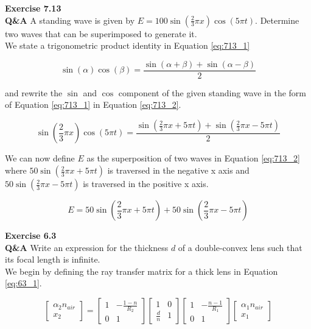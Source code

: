 \documentclass[main.tex]{subfiles}
\begin{document}
\textbf{Exercise 7.13}\\ %
\textbf{Q\&A} A standing wave is given by $E=100\sin(\frac{2}{3}\pi x) \cos( 5\pi t )$. Determine two waves that can be superimposed to generate it.\\

We state a trigonometric product identity in Equation \ref{eq:713_1}

\begin{equation}\label{eq:713_1}
\sin(\alpha)\cos(\beta) = \frac{\sin(\alpha + \beta) + \sin(\alpha - \beta)}{2}
\end{equation}

and rewrite the $\sin$ and $\cos$ component of the given standing wave in the form of Equation \ref{eq:713_1} in Equation \ref{eq:713_2}.

\begin{equation}\label{eq:713_2}
\sin(\frac{2}{3}\pi x)\cos(5\pi t) = \frac{\sin(\frac{2}{3}\pi x + 5\pi t) + \sin(\frac{2}{3}\pi x - 5\pi t)}{2}
\end{equation}

We can now define $E$ as the superposition of two waves in Equation \ref{eq:713_2} where $50 \sin(\frac{2}{3}\pi x + 5\pi t)$ is traversed in the negative x axis and $50 \sin(\frac{2}{3}\pi x - 5\pi t)$ is traversed in the positive x axis.

\begin{equation}\label{eq:713_2}
E = 50 \sin(\frac{2}{3}\pi x + 5\pi t) + 50 \sin(\frac{2}{3}\pi x - 5\pi t)
\end{equation}

\textbf{Exercise 6.3}\\
\textbf{Q\&A} Write an  expression for the thickness $d$ of a double-convex lens such that its focal length is infinite.\\

We begin by defining the ray transfer matrix for a thick lens in Equation \ref{eq:63_1}.

\begin{equation}\label{eq:63_1}
\begin{bmatrix}
    \alpha_2 n_{air}\\
    x_2
\end{bmatrix}
=
\begin{bmatrix}
    1   &   -\frac{1-n}{R_2} \\
    0   &   1
\end{bmatrix}
\begin{bmatrix}
    1   &   0 \\
    \frac{d}{n}   &   1
\end{bmatrix}
\begin{bmatrix}
    1   &   -\frac{n-1}{R_1} \\
    0   &   1
\end{bmatrix}
\begin{bmatrix}
    \alpha_{1}n_{air} \\
    x_1
\end{bmatrix}
\end{equation}
\end{document}
